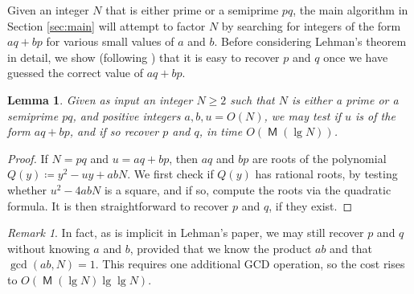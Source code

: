 \documentclass[reqno]{amsart}
\newtheorem{lem}[thm]{Lemma}
\theoremstyle{remark}
\newtheorem{rem}[thm]{Remark}
\numberwithin{equation}{section}
\numberwithin{thm}{section}
\DeclareMathOperator{\MM}{\mathsf{M}}
\renewcommand{\geq}{\geqslant}
\newcommand{\defeq}{\coloneqq}
\begin{document}
Given an integer $N$ that is either prime or a semiprime $pq$,
the main algorithm in Section \ref{sec:main} will attempt to factor $N$
by searching for integers of the form $aq + bp$ for various small values
of $a$ and $b$.
Before considering Lehman's theorem in detail,
we show (following \cite[Lem.~4.1]{Hit-timespace}) that it is easy
to recover $p$ and $q$ once we have guessed the correct value of $aq + bp$.
\begin{lem}
\label{lem:recover}
  Given as input an integer $N \geq 2$ such that
  $N$ is either a prime or a semiprime $pq$,
  and positive integers $a, b, u = O(N)$,
  we may test if $u$ is of the form $aq + bp$,
  and if so recover $p$ and $q$,
  in time $O(\MM(\lg N))$.
\end{lem}
\begin{proof}
  If $N = pq$ and $u = aq + bp$, then $aq$ and $bp$ are roots of the
  polynomial $Q(y) \defeq y^2 - uy + abN$.
  We first check if $Q(y)$ has rational roots,
  by testing whether $u^2 - 4abN$ is a square,
  and if so, compute the roots via the quadratic formula.
  It is then straightforward to recover $p$ and $q$, if they exist.
\end{proof}
\begin{rem}
\label{rem:lehman}
  In fact, as is implicit in Lehman's paper,
  we may still recover $p$ and $q$ without knowing $a$ and $b$,
  provided that we know the product $ab$ and that $\gcd(ab, N) = 1$.
  This requires one additional GCD operation,
  so the cost rises to $O(\MM(\lg N) \lg \lg N)$.
\end{rem}
\end{document}
